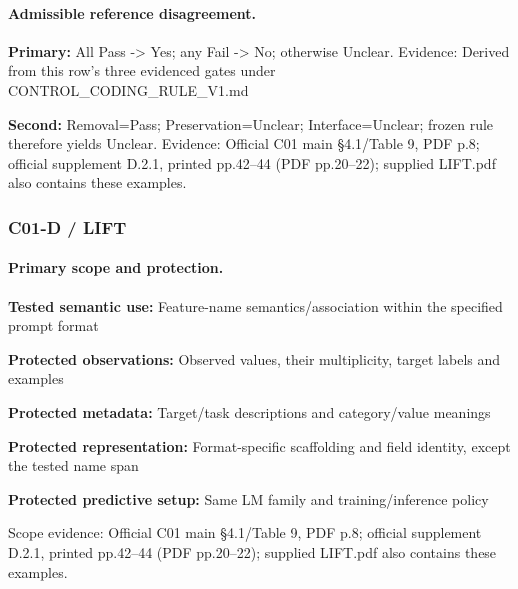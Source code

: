 \documentclass[10pt]{article}
\begin{document}
\paragraph{Admissible reference disagreement.}
\textbf{Primary:} All Pass -> Yes; any Fail -> No; otherwise Unclear. Evidence: Derived from this row’s three evidenced gates under CONTROL\_CODING\_RULE\_V1.md\par
\textbf{Second:} Removal=Pass; Preservation=Unclear; Interface=Unclear; frozen rule therefore yields Unclear. Evidence: Official C01 main §4.1/Table 9, PDF p.8; official supplement D.2.1, printed pp.42--44 (PDF pp.20--22); supplied LIFT.pdf also contains these examples.\par
\subsubsection*{C01-D / LIFT}
\paragraph{Primary scope and protection.}
\textbf{Tested semantic use:} Feature-name semantics/association within the specified prompt format\par
\textbf{Protected observations:} Observed values, their multiplicity, target labels and examples\par
\textbf{Protected metadata:} Target/task descriptions and category/value meanings\par
\textbf{Protected representation:} Format-specific scaffolding and field identity, except the tested name span\par
\textbf{Protected predictive setup:} Same LM family and training/inference policy\par
Scope evidence: Official C01 main §4.1/Table 9, PDF p.8; official supplement D.2.1, printed pp.42--44 (PDF pp.20--22); supplied LIFT.pdf also contains these examples.\par
\end{document}
